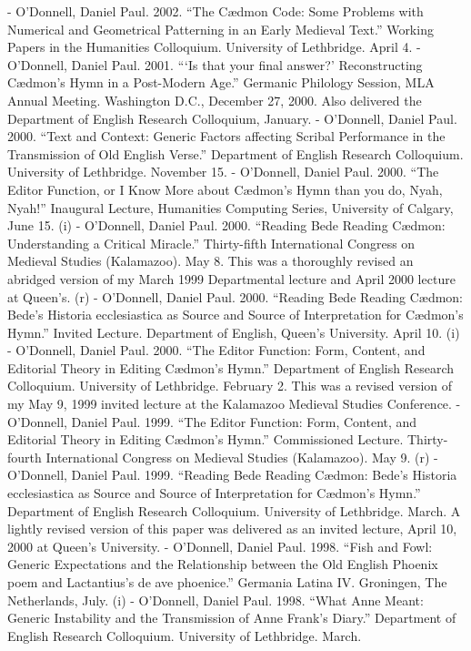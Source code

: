 - O'Donnell, Daniel Paul. 2002. “The Cædmon Code: Some Problems with Numerical and Geometrical Patterning in an Early Medieval Text.” Working Papers in the Humanities Colloquium. University of Lethbridge. April 4.
- O'Donnell, Daniel Paul. 2001. “‘Is that your final answer?’ Reconstructing Cædmon’s Hymn in a Post-Modern Age.” Germanic Philology Session, MLA Annual Meeting. Washington D.C., December 27, 2000. Also delivered the Department of English Research Colloquium, January.
- O'Donnell, Daniel Paul. 2000. “Text and Context: Generic Factors affecting Scribal Performance in the Transmission of Old English Verse.” Department of English Research Colloquium. University of Lethbridge. November 15.
- O'Donnell, Daniel Paul. 2000. “The Editor Function, or I Know More about Cædmon’s Hymn than you do, Nyah, Nyah!” Inaugural Lecture, Humanities Computing Series, University of Calgary, June 15. (i)
- O'Donnell, Daniel Paul. 2000. “Reading Bede Reading Cædmon: Understanding a Critical Miracle.” Thirty-fifth International Congress on Medieval Studies (Kalamazoo). May 8. This was a thoroughly revised an abridged version of my March 1999 Departmental lecture and April 2000 lecture at Queen’s. (r)
- O'Donnell, Daniel Paul. 2000. “Reading Bede Reading Cædmon: Bede’s Historia ecclesiastica as Source and Source of Interpretation for Cædmon’s Hymn.” Invited Lecture. Department of English, Queen’s University. April 10. (i)
- O'Donnell, Daniel Paul. 2000. “The Editor Function: Form, Content, and Editorial Theory in Editing Cædmon’s Hymn.” Department of English Research Colloquium. University of Lethbridge. February 2. This was a revised version of my May 9, 1999 invited lecture at the Kalamazoo Medieval Studies Conference.
- O'Donnell, Daniel Paul. 1999. “The Editor Function: Form, Content, and Editorial Theory in Editing Cædmon’s Hymn.” Commissioned Lecture. Thirty-fourth International Congress on Medieval Studies (Kalamazoo). May 9. (r)
- O'Donnell, Daniel Paul. 1999. “Reading Bede Reading Cædmon: Bede’s Historia ecclesiastica as Source and Source of Interpretation for Cædmon’s Hymn.” Department of English Research Colloquium. University of Lethbridge. March.  A lightly revised version of this paper was delivered as an invited lecture, April 10, 2000 at Queen’s University.
- O'Donnell, Daniel Paul. 1998. “Fish and Fowl: Generic Expectations and the Relationship between the Old English Phoenix poem and Lactantius’s de ave phoenice.” Germania Latina IV. Groningen, The Netherlands, July. (i)
- O'Donnell, Daniel Paul. 1998. “What Anne Meant: Generic Instability and the Transmission of Anne Frank’s Diary.” Department of English Research Colloquium. University of Lethbridge. March.
